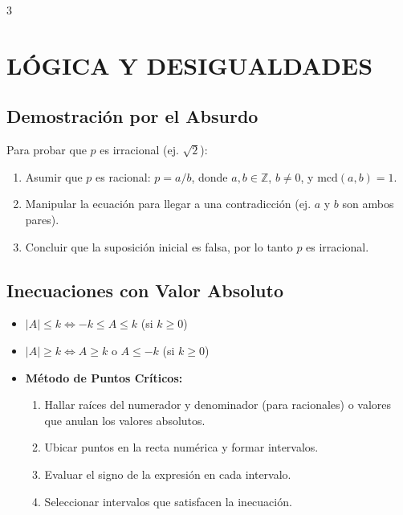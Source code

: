 \documentclass[8pt,letterpaper]{article}
\begin{document}
\begin{multicols*}{3}

\section*{LÓGICA Y DESIGUALDADES}

\subsection*{Demostración por el Absurdo}
Para probar que $p$ es irracional (ej. $\sqrt{2}$):
\begin{enumerate}[label=\arabic*.]
    \item Asumir que $p$ es racional: $p = a/b$, donde $a, b \in \mathbb{Z}$, $b \neq 0$, y $\text{mcd}(a,b)=1$.
    \item Manipular la ecuación para llegar a una contradicción (ej. $a$ y $b$ son ambos pares).
    \item Concluir que la suposición inicial es falsa, por lo tanto $p$ es irracional.
\end{enumerate}

\subsection*{Inecuaciones con Valor Absoluto}
\begin{itemize}
    \item $|A| \le k \iff -k \le A \le k$ (si $k \ge 0$)
    \item $|A| \ge k \iff A \ge k \text{ o } A \le -k$ (si $k \ge 0$)
    \item \textbf{Método de Puntos Críticos:}
    \begin{enumerate}[label=\arabic*.]
        \item Hallar raíces del numerador y denominador (para racionales) o valores que anulan los valores absolutos.
        \item Ubicar puntos en la recta numérica y formar intervalos.
        \item Evaluar el signo de la expresión en cada intervalo.
        \item Seleccionar intervalos que satisfacen la inecuación.
    \end{enumerate}
\end{itemize}


\end{multicols*}
\end{document}
